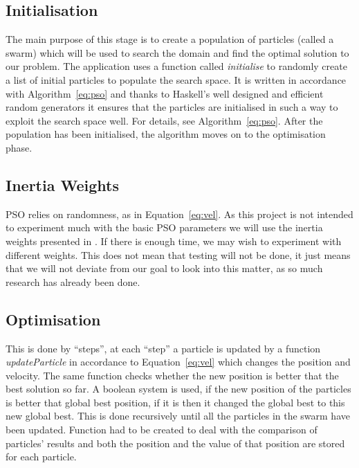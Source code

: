 \documentclass{pdfmx4020}
\begin{document}
    \subsection{Initialisation} %
    \label{sub:initialisation}
    The main purpose of this stage is to create a population of particles (called a swarm) which will be used to search the domain and find the optimal solution to our problem. The application uses a function called \textit{initialise} to randomly create a list of initial particles to populate the search space. It is written in accordance with Algorithm~\ref{eq:pso} and thanks to Haskell's well designed and efficient random generators \cite{random} it ensures that the particles are initialised in such a way to exploit the search space well. For details, see Algorithm~\ref{eq:pso}. After the population has been initialised, the algorithm moves on to the optimisation phase.
    \subsection{Inertia Weights} %
    \label{sub:inertia_weights}
    PSO relies on randomness, as in Equation~\ref{eq:vel}. As this project is not intended to experiment much with the basic PSO parameters we will use the inertia weights presented in \cite{constriction_factor_3}. If there is enough time, we may wish to experiment with different weights. This does not mean that testing will not be done, it just means that we will not deviate from our goal to look into this matter, as so much research has already been done\cite{inertia}.
    \subsection{Optimisation} %
    \label{sub:optimisation}
    This is done by ``steps'', at each ``step'' a particle is updated by a function \textit{updateParticle} in accordance to Equation~\ref{eq:vel} which changes the position and velocity. The same function checks whether the new position is better that the best solution so far. A boolean system is used, if the new position of the particles is better that global best position, if it is then it changed the global best to this new global best. This is done recursively until all the particles in the swarm have been updated. Function had to be created to deal with the comparison of particles' results and both the position and the value of that position are stored for each particle. 
\end{document}
